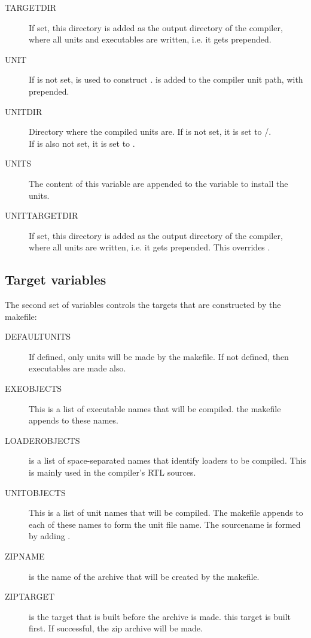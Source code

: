 \documentclass{report}
\begin{document}
\begin{description}
\item[TARGETDIR] If set, this directory is added as the output directory of
the compiler, where all units and executables are written, i.e. it gets
 prepended.

\item[UNIT] If  is not set,  is used to construct
.  is added to the compiler unit path, with 
prepended. 

\item[UNITDIR] Directory where the  compiled units are.
If  is not set, it is set to /. \\
If  is also not set, it is set to .

\item[UNITS] The content of this variable are appended to the
 variable to install the units.

\item[UNITTARGETDIR] If set, this directory is added as the output directory of
the compiler, where all units are written, i.e. it gets
 prepended. This overrides .
\end{description}

\subsection{Target variables}

The second set of variables controls the targets that are constructed
by the makefile:

\begin{description}
\item[DEFAULTUNITS] If defined, only units will be made by the makefile. If
not defined, then executables are made also.
\item[EXEOBJECTS] This is a list of executable names that will be compiled.
the makefile appends  to these names.
\item[LOADEROBJECTS] is a list of space-separated names that identify
loaders to be compiled. This is mainly used in the compiler's RTL sources.
\item[UNITOBJECTS] This is a list of unit names that will be compiled. The
makefile appends  to each of these names to form the unit file
name. The sourcename is formed by adding .
\item[ZIPNAME] is the name of the archive that will be created by the
makefile.
\item[ZIPTARGET] is the target that is built before the archive is made.
this target is built first. If successful, the zip archive will be made.
\end{description}
\end{document}

